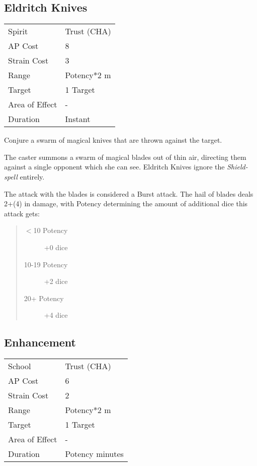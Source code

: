 \documentclass[11pt,a4paper,twocolumn]{book}
\begin{document}
\subsection*{Eldritch Knives}
{
	\begin{tabu} to 75mm{| X[l,4] | X[l,7] |}
		\hline
		Spirit         & Trust (CHA) \\
		AP Cost        & 8           \\
		Strain Cost    & 3           \\
		Range          & Potency*2 m \\
		Target         & 1 Target    \\
		Area of Effect & -           \\
		Duration       & Instant     \\ \hline
	\end{tabu}
	
}

\medskip

Conjure a swarm of magical knives that are thrown against the target.

The caster summons a swarm of magical blades out of thin air, directing them against a single opponent which she can see. Eldritch Knives ignore the \textit{Shield-spell} entirely.

The attack with the blades is considered a Burst attack. The hail of blades deals 2+(4) in damage, with Potency determining the amount of additional dice this attack gets:

\begin{quote}
	\begin{description}
		\item[$<$10 Potency] 	+0 dice
		\item[10-19 Potency] 	+2 dice
		\item[20+ Potency] 	    +4 dice
	\end{description}
\end{quote}




\subsection*{Enhancement}
{
	\begin{tabu} to 75mm{| X[l,4] | X[l,7] |}
		\hline
		School 			& Trust (CHA) 		\\
		AP Cost	      	& 6 					\\
		Strain Cost     & 2 					\\
		Range     		& Potency*2 m			\\
		Target      	& 1 Target				\\
		Area of Effect  & -  	 				\\
		Duration     	& Potency minutes 		\\ \hline
	\end{tabu}
	
}
\end{document}
